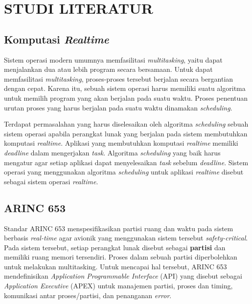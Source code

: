 \chapter{STUDI LITERATUR}

\section{Komputasi \textit{Realtime}}

Sistem operasi modern umumnya memfasilitasi \textit{multitasking}, yaitu dapat menjalankan dua atau lebih program secara
bersamaan. Untuk dapat memfasilitasi \textit{multitasking}, proses-proses tersebut berjalan secara bergantian dengan
cepat. Karena itu, sebuah sistem operasi harus memiliki suatu algoritma untuk memilih program yang akan berjalan pada
suatu waktu. Proses penentuan urutan proses yang harus berjalan pada suatu waktu dinamakan \textit{scheduling}.

Terdapat permasalahan yang harus diselesaikan oleh algoritma \textit{scheduling} sebuah sistem operasi apabila perangkat
lunak yang berjalan pada sistem membutuhkan komputasi \textit{realtime}. Aplikasi yang membutuhkan komputasi
\textit{realtime} memiliki \textit{deadline} dalam mengerjakan \textit{task}. Algoritma \textit{scheduling} yang baik
harus mengatur agar setiap aplikasi dapat menyelesaikan \textit{task} sebelum \textit{deadline}. Sistem operasi yang
menggunakan algoritma \textit{scheduling} untuk aplikasi \textit{realtime} disebut sebagai sistem operasi
\textit{realtime}.

\section{ARINC 653}

Standar ARINC 653 menspesifikasikan partisi ruang dan waktu pada sistem berbasis \textit{real-time} agar avionik yang
menggunakan sistem tersebut \textit{safety-critical}. Pada sistem tersebut, setiap perangkat lunak disebut sebagai
\textbf{partisi} dan memiliki ruang memori tersendiri. Proses dalam sebuah partisi diperbolehkan untuk melakukan
multitasking. Untuk mencapai hal tersebut, ARINC 653 mendefinisikan \textit{Application Programmable Interface} (API)
yang disebut sebagai \textit{Application Executive} (APEX) untuk manajemen partisi, proses dan timing, komunikasi antar
proses/partisi, dan penanganan \textit{error}.

